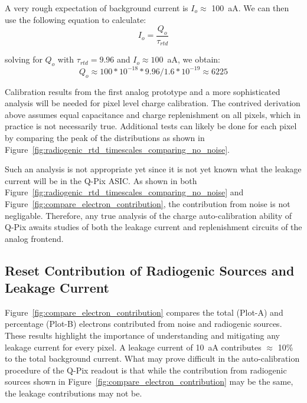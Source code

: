 A very rough expectation of background current is $I_o \approx$ 100~\unit{aA}.
We can then use the following equation to calculate:
$$
I_{o} = \frac{Q_{o}}{\tau_{rtd}}
$$

solving for $Q_{o}$ with $\tau_{rtd} = 9.96$ and $I_{o} \approx 100$~\unit{aA}, we obtain:
$$
Q_{o} \approx 100*10^{-18} * 9.96 / 1.6*10^{-19} \approx 6225
$$

Calibration results from the first analog prototype and a more sophisticated analysis will be needed for pixel level charge calibration.
The contrived derivation above assumes equal capacitance and charge replenishment on all pixels, which in practice is not necessarily true.
Additional tests can likely be done for each pixel by comparing the peak of the distributions as shown in Figure~\ref{fig:radiogenic_rtd_timescales_comparing_no_noise}.

Such an analysis is not appropriate yet since it is not yet known what the leakage current will be in the Q-Pix ASIC.
As shown in both Figure~\ref{fig:radiogenic_rtd_timescales_comparing_no_noise} and Figure~\ref{fig:compare_electron_contribution}, the contribution from noise is not negligable.
Therefore, any true analysis of the charge auto-calibration ability of Q-Pix awaits studies of both the leakage current and replenishment circuits of the analog frontend.

\subsection{Reset Contribution of Radiogenic Sources and Leakage Current}

Figure~\ref{fig:compare_electron_contribution} compares the total (Plot-A) and percentage (Plot-B) electrons contributed from noise and radiogenic sources.
These results highlight the importance of understanding and mitigating any leakage current for every pixel.
A leakage current of 10~\unit{aA} contributes $\approx$ 10\% to the total background current.
What may prove difficult in the auto-calibration procedure of the Q-Pix readout is that while the contribution from radiogenic sources shown in Figure~\ref{fig:compare_electron_contribution} may be the same, the leakage contributions may not be.

